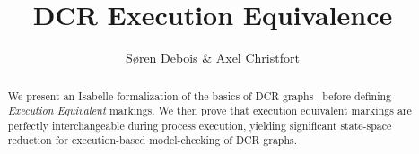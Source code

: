 \documentclass[11pt,a4paper]{article}
\begin{document}
\title{DCR Execution Equivalence}
\author{Søren Debois \& Axel Christfort}
\maketitle

\begin{abstract}
  We present an Isabelle formalization of the basics of DCR-graphs~\cite{discover} before defining \textit{Execution Equivalent} markings.
  We then prove that execution equivalent markings are perfectly interchangeable during process execution, yielding significant state-space reduction for execution-based model-checking of DCR graphs.
\end{abstract}

\tableofcontents





\end{document}
